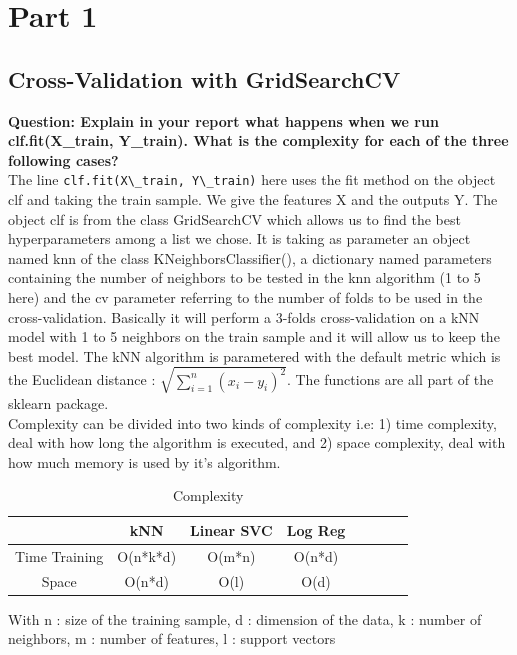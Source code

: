 \section{Part 1}

\subsection{Cross-Validation with GridSearchCV}
\textbf{{Question}: Explain in your report what happens when we run clf.fit(X\_train, Y\_train). What is the complexity for each of the three following cases?} \\

The line \verb|clf.fit(X\_train, Y\_train)| here uses the fit method on the object  clf and taking the train sample. We give the features X and the outputs Y. The object clf is from the class GridSearchCV which allows us to find the best hyperparameters among a list we chose. It is taking as parameter an object named knn of the class KNeighborsClassifier(), a dictionary named parameters containing the number of neighbors to be tested in the knn algorithm (1 to 5 here) and the cv parameter referring to the number of folds to be used in the cross-validation. Basically it will perform a 3-folds cross-validation on a kNN model with 1 to 5 neighbors on the train sample and it will allow us to keep the best model. The kNN algorithm is parametered with the default metric which is the Euclidean distance : $\sqrt{\sum^n_{i=1}(x_i - y_i)^2}$. The functions are all part of the sklearn package. \\
Complexity can be divided into two kinds of complexity i.e: 1) time complexity, deal with how long the algorithm is executed, and 2) space complexity, deal with how much memory is used by it's algorithm.\\
\begin{table}[ht]
		\caption{Complexity}
		\vspace{0.5cm}
		\centering
		\begin{tabular}{|c|c|c|c|c|c|c|c|}
			\hline
			& kNN & Linear SVC & Log Reg   \\  [0.3ex]
			\hline 
			Time Training    & O(n*k*d)       &  O(m*n)     & O(n*d)        \\ 
			\hline 
			Space  &  O(n*d)      &  O(l)     &  O(d)      \\ 
			\hline 
		\end{tabular} 
        \label{table:nonlin}
	\end{table}	

With n : size of the training sample, d : dimension of the data, k : number of neighbors, m : number of features, l : support vectors

